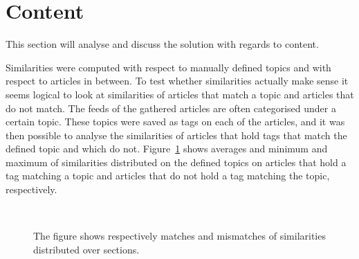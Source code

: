 \section{Content}
This section will analyse and discuss the solution with regards to content.

Similarities were computed with respect to manually defined topics and with respect to articles in between. To test whether similarities actually make sense it seems logical to look at similarities of articles that match a topic and articles that do not match. The feeds of the gathered articles are often categorised under a certain topic. These topics were saved as tags on each of the articles, and it was then possible to analyse the similarities of articles that hold tags that match the defined topic and which do not. Figure~\ref{fig:sim-analysis} shows averages and minimum and maximum of similarities distributed on the defined topics on articles that hold a tag matching a topic and articles that do not hold a tag matching the topic, respectively.
\begin{figure}[h!tp]
	\myfloatalign
	\\
			\caption{The figure shows respectively matches and mismatches of similarities distributed over sections.}
			\label{fig:sim-analysis}
\end{figure}
